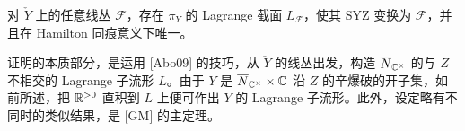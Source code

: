 \begin{theorem}
对 $\check Y$ 上的任意线丛 $\mathcal F$，存在 $\pi_Y$ 的 Lagrange 截面 $L_{\mathcal F}$，使其 SYZ 变换为 $\mathcal F$，并且在 Hamilton 同痕意义下唯一。
\end{theorem}

证明的本质部分，是运用 [Abo09] 的技巧，从 $\check Y$ 的线丛出发，构造 $\overline{N}_{\mathbb{C}^\times}$ 的与 $Z$ 不相交的 Lagrange 子流形 $L$。由于 $Y$ 是 $\overline{N}_{\mathbb{C}^\times}\times\mathbb{C}$ 沿 $Z$ 的辛爆破的开子集，如前所述，把 $\mathbb{R}^{>0}$ 直积到 $L$ 上便可作出 $Y$ 的 Lagrange 子流形。此外，设定略有不同时的类似结果，是 [GM] 的主定理。

